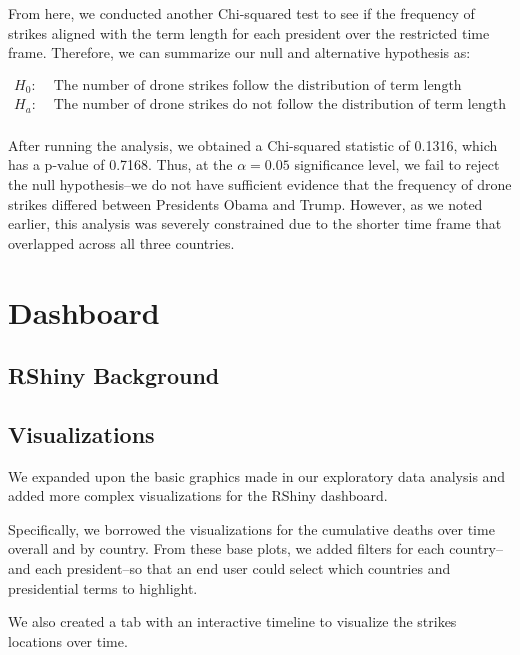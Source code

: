 \documentclass[
]{article}
\begin{document}
From here, we conducted another Chi-squared test to see if the frequency
of strikes aligned with the term length for each president over the
restricted time frame. Therefore, we can summarize our null and
alternative hypothesis as:

\[
\begin{aligned}
H_0: & \text{ The number of drone strikes follow the distribution of term length} \\
H_a: & \text{ The number of drone strikes do not follow the distribution of term length} \\
\end{aligned}
\]

After running the analysis, we obtained a Chi-squared statistic of
0.1316, which has a p-value of 0.7168. Thus, at the \(\alpha = 0.05\)
significance level, we fail to reject the null hypothesis--we do not
have sufficient evidence that the frequency of drone strikes differed
between Presidents Obama and Trump. However, as we noted earlier, this
analysis was severely constrained due to the shorter time frame that
overlapped across all three countries.

\hypertarget{dashboard}{%
\section{Dashboard}\label{dashboard}}

\hypertarget{rshiny-background}{%
\subsection{RShiny Background}\label{rshiny-background}}

\hypertarget{visualizations}{%
\subsection{Visualizations}\label{visualizations}}

We expanded upon the basic graphics made in our exploratory data
analysis and added more complex visualizations for the RShiny dashboard.

Specifically, we borrowed the visualizations for the cumulative deaths
over time overall and by country. From these base plots, we added
filters for each country--and each president--so that an end user could
select which countries and presidential terms to highlight.

We also created a tab with an interactive timeline to visualize the
strikes locations over time.
\end{document}
